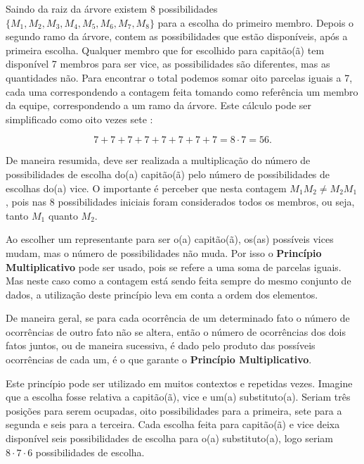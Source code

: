 


Saindo da raiz da árvore existem 8 possibilidades $\{M_1, M_2, M_3, M_4, M_5, M_6, M_7, M_8\}$ para a escolha do primeiro membro. Depois o segundo ramo da árvore, contem as possibilidades que estão disponíveis, após a primeira escolha. Qualquer membro que for escolhido para capitão(ã) tem disponível 7 membros para ser vice, as possibilidades são diferentes, mas as quantidades não. Para encontrar o total podemos somar oito parcelas iguais a 7, cada uma correspondendo a contagem feita tomando como referência um membro da equipe, correspondendo a um ramo da árvore. Este cálculo pode ser simplificado como oito vezes sete :

$$7+7+7+7+7+7+7+7=  8 \cdot 7= 56.$$

De maneira resumida, deve ser realizada a multiplicação do número de possibilidades de escolha do(a) capitão(ã)  pelo número de possibilidades de escolhas do(a) vice. O importante é perceber que nesta contagem $M_1M_2  \neq M_2M_1$, pois nas 8 possibilidades iniciais foram considerados todos os membros, ou seja, tanto $M_1$ quanto $M_2$.  

Ao escolher um representante para ser o(a) capitão(ã), os(as) possíveis vices mudam, mas o número de possibilidades não muda. Por isso o \textbf{Princípio Multiplicativo} pode ser usado, pois se refere a uma soma de parcelas iguais. Mas neste caso como a contagem está sendo feita sempre do mesmo conjunto de dados, a utilização deste princípio leva em conta a ordem dos elementos.

De maneira geral,  se para cada ocorrência de um determinado fato o número de ocorrências de outro fato não se altera, então o número de ocorrências dos dois fatos juntos, ou de maneira sucessiva,  é dado pelo produto das possíveis ocorrências de cada um, é o que garante o \textbf{Princípio Multiplicativo}. 

Este princípio pode ser utilizado em muitos contextos e repetidas vezes. Imagine que a escolha fosse relativa a capitão(ã), vice e um(a) substituto(a). Seriam três posições para serem ocupadas, oito possibilidades para a primeira, sete para a segunda e seis para a terceira. Cada escolha feita para capitão(ã) e vice deixa disponível seis possibilidades de escolha para o(a) substituto(a), logo seriam $8\cdot 7 \cdot 6$ possibilidades de escolha.

